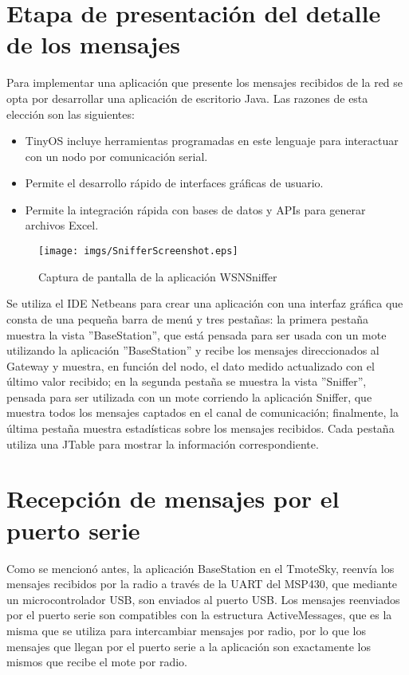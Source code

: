 \section{Etapa de presentación del detalle de los mensajes}
Para implementar una aplicación que presente los mensajes recibidos de la red se opta por desarrollar una aplicación de escritorio Java. Las razones de esta elección son las siguientes:

\begin{itemize}
\item TinyOS incluye herramientas programadas en este lenguaje para interactuar con un nodo por comunicación serial.
\item Permite el desarrollo rápido de interfaces gráficas de usuario.
\item Permite la integración rápida con bases de datos y APIs para generar archivos Excel.
\end{itemize}

\begin{figure}[H]
	\centering
 	\texttt{[image: imgs/SnifferScreenshot.eps]} 
 	\caption{Captura de pantalla de la aplicación WSNSniffer}
\end{figure}

Se utiliza el IDE Netbeans para crear una aplicación con una interfaz gráfica que consta de una pequeña barra de menú y tres pestañas: la primera pestaña muestra la vista ''BaseStation'', que está pensada para ser usada con un mote utilizando la aplicación ''BaseStation'' y recibe los mensajes direccionados al Gateway y muestra, en función del nodo, el dato medido actualizado con el último valor recibido; en la segunda pestaña se muestra la vista ''Sniffer'', pensada para ser utilizada con un mote corriendo la aplicación Sniffer, que muestra todos los mensajes captados en el canal de comunicación; finalmente, la última pestaña muestra estadísticas sobre los mensajes recibidos. Cada pestaña utiliza una JTable para mostrar la información correspondiente.

\section{Recepción de mensajes por el puerto serie}
Como se mencionó antes, la aplicación BaseStation en el TmoteSky, reenvía los mensajes recibidos por la radio a través de la UART del MSP430, que mediante un microcontrolador USB, son enviados al puerto USB. Los mensajes reenviados por el puerto serie son compatibles con la estructura ActiveMessages, que es la misma que se utiliza para intercambiar mensajes por radio, por lo que los mensajes que llegan por el puerto serie a la aplicación  son exactamente los mismos que recibe el mote por radio.\\

